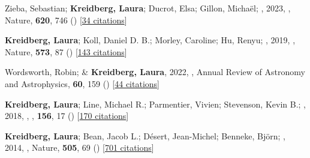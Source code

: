 \documentclass[12pt,letterpaper]{article}
\begin{document}



\begin{list}{}{\cvlist}
\item[{\color{numcolor}\scriptsize23}] Zieba, Sebastian; \textbf{Kreidberg, Laura}; Ducrot, Elsa; Gillon, Micha{\"e}l; \etal, 2023, , Nature, \textbf{620}, 746 () [\href{https://ui.adsabs.harvard.edu/abs/2023Natur.620..746Z}{34 citations}]

\item[{\color{numcolor}\scriptsize2}] \textbf{Kreidberg, Laura}; Koll, Daniel D. B.; Morley, Caroline; Hu, Renyu; \etal, 2019, , Nature, \textbf{573}, 87 () [\href{https://ui.adsabs.harvard.edu/abs/2019Natur.573...87K}{143 citations}]

\item[{\color{numcolor}\scriptsize3}] Wordsworth, Robin; \& \textbf{Kreidberg, Laura}, 2022, , Annual Review of Astronomy and Astrophysics, \textbf{60}, 159 () [\href{https://ui.adsabs.harvard.edu/abs/2022ARA&A..60..159W}{44 citations}]

\item[{\color{numcolor}\scriptsize4}] \textbf{Kreidberg, Laura}; Line, Michael R.; Parmentier, Vivien; Stevenson, Kevin B.; \etal, 2018, , \aj, \textbf{156}, 17 () [\href{https://ui.adsabs.harvard.edu/abs/2018AJ....156...17K}{170 citations}]


\item[{\color{numcolor}\scriptsize5}] \textbf{Kreidberg, Laura}; Bean, Jacob L.; D{\'e}sert, Jean-Michel; Benneke, Bj{\"o}rn; \etal, 2014, , Nature, \textbf{505}, 69 () [\href{https://ui.adsabs.harvard.edu/abs/2014Natur.505...69K}{701 citations}]

\end{list}
\end{document}
